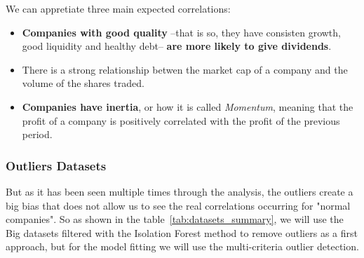 \documentclass[11pt,english,a4paper,hidelinks]{book}
\begin{document}
\noindent We can appretiate three main expected correlations:
\begin{itemize}
    \item \textbf{Companies with good quality} --that is so, they have consisten growth, good liquidity and healthy debt-- \textbf{are more likely to give dividends}.
    \item There is a strong relationship betwen the market cap of a company and the volume of the shares traded.
    \item \textbf{Companies have inertia}, or how it is called \textit{Momentum}, meaning that the profit of a company is positively correlated with the profit of the previous period.
\end{itemize}

\subsubsection{Outliers Datasets}
But as it has been seen multiple times through the analysis, the outliers create a big bias that does not allow us to see the real correlations occurring for "normal companies". So as shown in the table~\ref{tab:datasets_summary}, we will use the Big datasets filtered with the Isolation Forest method to remove outliers as a first approach, but for the model fitting we will use the multi-criteria outlier detection.
\end{document}
